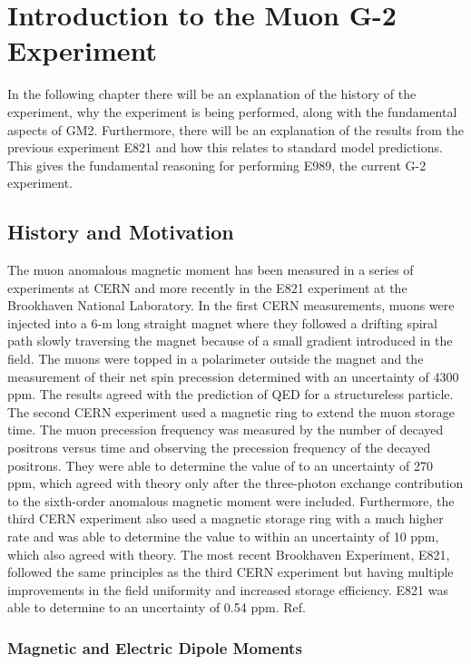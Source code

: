 \documentclass[./Thesis]{subfiles}
\begin{document}
\chapter{Introduction to the Muon G-2 Experiment}

In the following chapter there will be an explanation of the history of the experiment, why the experiment is being performed, along with the fundamental aspects of GM2.  Furthermore, there will be an explanation of the results from the previous experiment E821 and how this relates to standard model predictions. This gives the fundamental reasoning for performing E989, the current G-2 experiment.

\section{History and Motivation}

The muon anomalous magnetic moment has been measured in a series of experiments at CERN and more recently in the E821 experiment at the Brookhaven National Laboratory. In the first CERN measurements, muons were injected into a 6-m long straight magnet where they followed a drifting spiral path slowly traversing the magnet because of a small gradient introduced in the field. The muons were topped in a polarimeter outside the magnet and the measurement of their net spin precession determined with an uncertainty of 4300 ppm.  The results agreed with the prediction of QED for a structureless particle.\cite{Cern1} The second CERN experiment used a magnetic ring to extend the muon storage time. The muon precession frequency was measured by the number of decayed positrons versus time and observing the precession frequency of the decayed positrons. They were able to determine the value of to an uncertainty of 270 ppm, which agreed with theory only after the three-photon exchange contribution to the sixth-order anomalous magnetic moment were included.\cite{Cern2}  Furthermore, the third CERN experiment also used a magnetic storage ring with a much higher rate and was able to determine the value to within an uncertainty of 10 ppm, which also agreed with theory.\cite{Cern3} The most recent Brookhaven Experiment, E821, followed the same principles as the third CERN experiment but having multiple improvements in the field uniformity and increased storage efficiency. E821 was able to determine to an uncertainty of 0.54 ppm.  Ref.\cite{TDR}

\subsection{Magnetic and Electric Dipole Moments}
\end{document}

